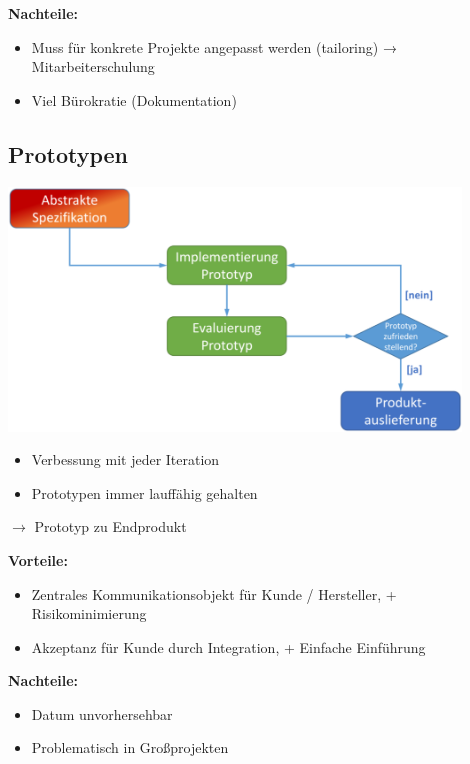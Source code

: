 \documentclass[11pt, a4paper]{article}
\begin{document}
\textbf{Nachteile:}
\begin{itemize}
    \item Muss für konkrete Projekte angepasst werden (tailoring) → Mitarbeiterschulung
    \item Viel Bürokratie (Dokumentation)
\end{itemize}


\subsection{Prototypen}


\begin{minipage}[h]{0.45\textwidth}
    \centering \includegraphics[width=0.9\textwidth]{Vorgehen-03.png} 
    \raggedright
\end{minipage}
\begin{minipage}[h]{0.45\textwidth}
    \tiny
    \begin{itemize}
        \item Verbessung mit jeder Iteration
        \item Prototypen immer lauffähig gehalten
    \end{itemize}
    
    \raggedleft $\rightarrow$ Prototyp zu Endprodukt
\end{minipage}

\raggedright
\normalsize

\textbf{Vorteile:}
\begin{itemize}
    \item Zentrales Kommunikationsobjekt für Kunde / Hersteller, + Risikominimierung
    \item Akzeptanz für Kunde durch Integration, + Einfache Einführung
\end{itemize}

\textbf{Nachteile:}
\begin{itemize}
    \item Datum unvorhersehbar
    \item Problematisch in Großprojekten
\end{itemize}
\end{document}
